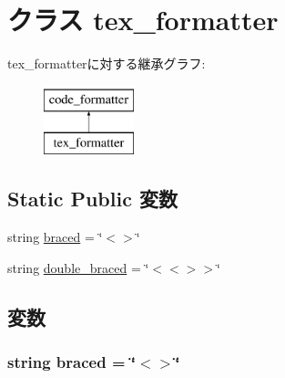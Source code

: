 \hypertarget{classslicc_1_1generate_1_1tex_1_1tex__formatter}{
\section{クラス tex\_\-formatter}
\label{classslicc_1_1generate_1_1tex_1_1tex__formatter}
}
tex\_\-formatterに対する継承グラフ:\begin{figure}[H]
\begin{center}
\leavevmode
\includegraphics[height=2cm]{classslicc_1_1generate_1_1tex_1_1tex__formatter}
\end{center}
\end{figure}
\subsection*{Static Public 変数}
\begin{DoxyCompactItemize}
\item 
string \hyperlink{classslicc_1_1generate_1_1tex_1_1tex__formatter_a935da82b8051a1db1c662d8e4bd75e58}{braced} = \char`\"{}$<$$>$\char`\"{}
\item 
string \hyperlink{classslicc_1_1generate_1_1tex_1_1tex__formatter_af6860356c79d14b959158766081ef166}{double\_\-braced} = \char`\"{}$<$$<$$>$$>$\char`\"{}
\end{DoxyCompactItemize}


\subsection{変数}
\hypertarget{classslicc_1_1generate_1_1tex_1_1tex__formatter_a935da82b8051a1db1c662d8e4bd75e58}{
\subsubsection[{braced}]{\setlength{\rightskip}{0pt plus 5cm}string {\bf braced} = \char`\"{}$<$$>$\char`\"{}}}
\label{classslicc_1_1generate_1_1tex_1_1tex__formatter_a935da82b8051a1db1c662d8e4bd75e58}


